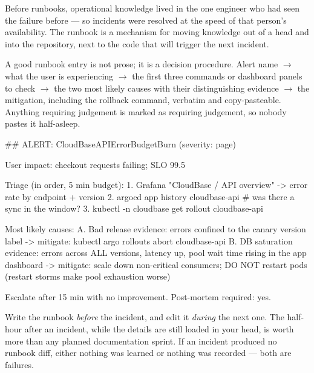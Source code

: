  Before runbooks, operational knowledge lived in the one engineer who had seen the failure before --- so incidents were resolved at the speed of that person's availability. The runbook is a mechanism for moving knowledge out of a head and into the repository, next to the code that will trigger the next incident.

 A good runbook entry is not prose; it is a decision procedure. Alert name $\rightarrow$ what the user is experiencing $\rightarrow$ the first three commands or dashboard panels to check $\rightarrow$ the two most likely causes with their distinguishing evidence $\rightarrow$ the mitigation, including the rollback command, verbatim and copy-pasteable. Anything requiring judgement is marked as requiring judgement, so nobody pastes it half-asleep.

\begin{outbox}
## ALERT: CloudBaseAPIErrorBudgetBurn (severity: page)

User impact: checkout requests failing; SLO 99.5%

Triage (in order, 5 min budget):
  1. Grafana "CloudBase / API overview" -> error rate by endpoint + version
  2. argocd app history cloudbase-api      # was there a sync in the window?
  3. kubectl -n cloudbase get rollout cloudbase-api

Most likely causes:
  A. Bad release      evidence: errors confined to the canary version label
     -> mitigate: kubectl argo rollouts abort cloudbase-api
  B. DB saturation    evidence: errors across ALL versions, latency up,
                      pool wait time rising in the app dashboard
     -> mitigate: scale down non-critical consumers; DO NOT restart pods
        (restart storms make pool exhaustion worse)

Escalate after 15 min with no improvement. Post-mortem required: yes.
\end{outbox}

\begin{opsnote}
Write the runbook \emph{before} the incident, and edit it \emph{during} the next one. The half-hour after an incident, while the details are still loaded in your head, is worth more than any planned documentation sprint. If an incident produced no runbook diff, either nothing was learned or nothing was recorded --- both are failures.
\end{opsnote}

